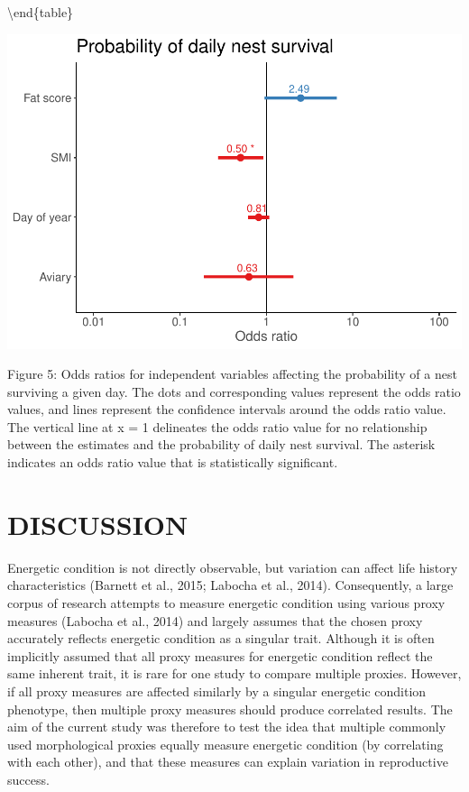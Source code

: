 \documentclass[
]{article}
\begin{document}
\textbackslash end\{table\}

\includegraphics{gcondition_files/figure-latex/logoddfig-1.pdf}

Figure 5: Odds ratios for independent variables affecting the
probability of a nest surviving a given day. The dots and corresponding
values represent the odds ratio values, and lines represent the
confidence intervals around the odds ratio value. The vertical line at x
= 1 delineates the odds ratio value for no relationship between the
estimates and the probability of daily nest survival. The asterisk
indicates an odds ratio value that is statistically significant.

\hypertarget{discussion}{%
\section{DISCUSSION}\label{discussion}}

Energetic condition is not directly observable, but variation can affect
life history characteristics (Barnett et al., 2015; Labocha et al.,
2014). Consequently, a large corpus of research attempts to measure
energetic condition using various proxy measures (Labocha et al., 2014)
and largely assumes that the chosen proxy accurately reflects energetic
condition as a singular trait. Although it is often implicitly assumed
that all proxy measures for energetic condition reflect the same
inherent trait, it is rare for one study to compare multiple proxies.
However, if all proxy measures are affected similarly by a singular
energetic condition phenotype, then multiple proxy measures should
produce correlated results. The aim of the current study was therefore
to test the idea that multiple commonly used morphological proxies
equally measure energetic condition (by correlating with each other),
and that these measures can explain variation in reproductive success.
\end{document}
